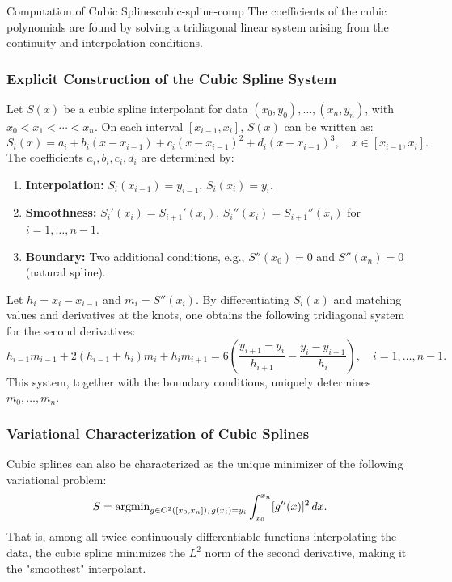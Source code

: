 \begin{remark}{Computation of Cubic Splines}{cubic-spline-comp}
    The coefficients of the cubic polynomials are found by solving a tridiagonal linear system arising from the continuity and interpolation conditions.
\end{remark}

\subsubsection{Explicit Construction of the Cubic Spline System}
Let \(S(x)\) be a cubic spline interpolant for data \((x_0, y_0), \ldots, (x_n, y_n)\), with \(x_0 < x_1 < \cdots < x_n\). On each interval \([x_{i-1}, x_i]\), \(S(x)\) can be written as:
\[
    S_i(x) = a_i + b_i (x - x_{i-1}) + c_i (x - x_{i-1})^2 + d_i (x - x_{i-1})^3, \quad x \in [x_{i-1}, x_i].
\]
The coefficients \(a_i, b_i, c_i, d_i\) are determined by:
\begin{enumerate}[nosep]
    \item \textbf{Interpolation:} \(S_i(x_{i-1}) = y_{i-1}\), \(S_i(x_i) = y_i\).
    \item \textbf{Smoothness:} \(S_i'(x_i) = S_{i+1}'(x_i)\), \(S_i''(x_i) = S_{i+1}''(x_i)\) for \(i=1,\ldots,n-1\).
    \item \textbf{Boundary:} Two additional conditions, e.g., \(S''(x_0) = 0\) and \(S''(x_n) = 0\) (natural spline).
\end{enumerate}
Let \(h_i = x_i - x_{i-1}\) and \(m_i = S''(x_i)\). By differentiating \(S_i(x)\) and matching values and derivatives at the knots, one obtains the following tridiagonal system for the second derivatives:
\[
    h_{i-1} m_{i-1} + 2(h_{i-1} + h_i) m_i + h_i m_{i+1} = 6 \left( \frac{y_{i+1} - y_i}{h_{i+1}} - \frac{y_i - y_{i-1}}{h_i} \right), \quad i=1,\ldots,n-1.
\]
This system, together with the boundary conditions, uniquely determines \(m_0, \ldots, m_n\).

\subsubsection{Variational Characterization of Cubic Splines}
Cubic splines can also be characterized as the unique minimizer of the following variational problem:
\[
    S = \operatorname{argmin}_{g \in C^2([x_0, x_n]),\, g(x_i) = y_i} \int_{x_0}^{x_n} [g''(x)]^2 \, dx.
\]
That is, among all twice continuously differentiable functions interpolating the data, the cubic spline minimizes the \(L^2\) norm of the second derivative, making it the "smoothest" interpolant.

